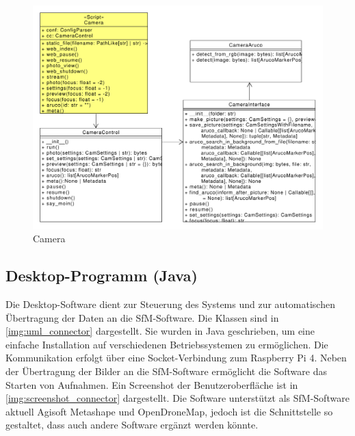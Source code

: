 \documentclass[./00PhotoBox.tex]{subfiles}
\begin{document}

\begin{figure}
  \centering
  \includegraphics[width=1\textwidth]{./img/uml/uml_camera_classdiagramm.pdf}
  \caption{Camera} %
  \label{img:uml_camera} %
\end{figure}


\subsection{Desktop-Programm (Java)}
Die Desktop-Software dient zur Steuerung des Systems und zur automatischen Über\-tragung der Daten an die \gls{SfM}-Software. Die Klassen sind in \autoref{img:uml_connector} dargestellt. Sie wurden in Java geschrieben, um eine einfache Installation auf verschiedenen Betriebssystemen zu ermöglichen. Die Kommunikation erfolgt über eine Socket-Verbindung zum Raspberry Pi 4. Neben der Übertragung der Bilder an die \gls{SfM}-Software ermöglicht die Software das Starten von Aufnahmen. Ein Screenshot der Benutzeroberfläche ist in \autoref{img:screenshot_connector} dargestellt. Die Software unterstützt als \gls{SfM}-Software aktuell Agisoft Metashape und OpenDroneMap, jedoch ist die Schnittstelle so gestaltet, dass auch andere Software ergänzt werden könnte.

\end{document}
